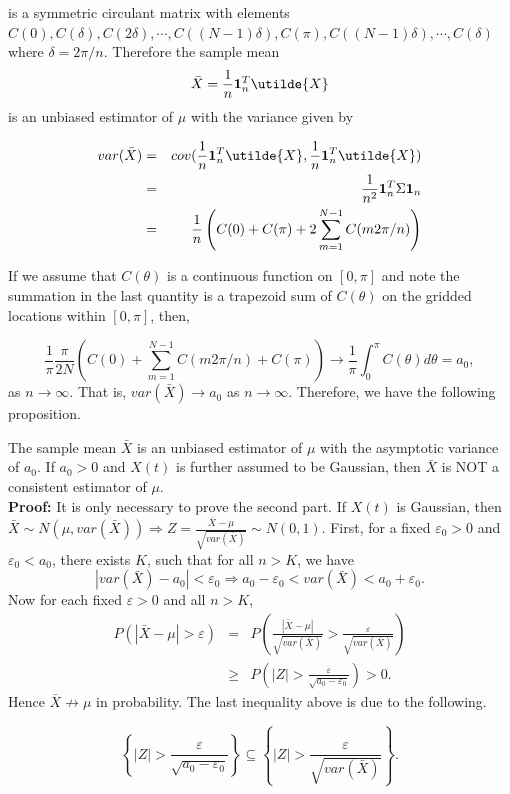 is a symmetric circulant matrix with elements $C(0),C(\delta), C(2\delta), \cdots, C((N-1)\delta), C(\pi),  C((N-1)\delta), \cdots, C(\delta)$ where $\delta = 2\pi/n$. Therefore the sample mean
\[
\bar{X} = \frac{1}{n}{\bf 1}_n^T \utilde{X}
\]
is an unbiased estimator of $\mu$ with the variance given by

\begin{eqnarray*}
var(\bar{X}) &=& cov(\frac{1}{n}{\bf 1}_n^T \utilde{X}, \frac{1}{n}{\bf 1}_n^T \utilde{X}) \nonumber \\
	&=& \frac{1}{n^2}{\bf 1}_n^T \Sigma {\bf 1}_n \nonumber \\
	&=& \frac{1}{n} \left(C(0)+C(\pi)+2 \sum_{m=1}^{N-1}C(m 2\pi/n)\right) \nonumber
\end{eqnarray*}

If we assume that $C(\theta)$ is a continuous function on $[0, \pi]$ and note the summation in the last quantity is a trapezoid sum of $C(\theta)$ on the gridded locations within $[0, \pi]$, then,

\[
\frac{1}{\pi} \frac{\pi}{2 N} \left(C(0) + \sum_{m=1}^{N-1}C(m 2\pi/n) + C(\pi) \right) \to \frac{1}{\pi} \int_0^\pi C(\theta)d\theta = a_0,
\]
as $n \to \infty$. That is, $var(\bar{X}) \to a_0$ as $n \to \infty$. Therefore, we have the following proposition. \\

\begin{prop} \label{prop3.1}

The sample mean $\bar{X}$ is an unbiased estimator of $\mu$ with the asymptotic variance of $a_0$. If $a_0 > 0$ and $X(t)$ is further assumed to be Gaussian, then $\bar{X}$ is NOT a consistent estimator of $\mu$. \\

{\bf Proof:} It is only necessary to prove the second part. If $X(t)$ is Gaussian, then $\bar{X} \sim N(\mu, var(\bar{X})) \Rightarrow Z = \frac{\bar{X} - \mu}{\sqrt{var(\bar{X})}} \sim N(0, 1)$. First, for a fixed $\varepsilon_0 > 0$ and $\varepsilon_0 < a_0$, there exists $K$, such that for all $n > K$, we have
\[
|var(\bar{X}) - a_0| < \varepsilon_0 \Rightarrow a_0 - \varepsilon_0 < var(\bar{X}) < a_0 + \varepsilon_0.
\]
Now for each fixed $\varepsilon > 0$ and all $n > K$,
\begin{eqnarray*}
P\left(|\bar{X} - \mu| > \varepsilon\right) &=& P\left(\frac{|\bar{X} - \mu|}{\sqrt{var(\bar{X})}} > \frac{\varepsilon}{\sqrt{var(\bar{X})}} \right) \\
&\ge& P\left(|Z| > \frac{\varepsilon}{\sqrt{a_0 - \varepsilon_0}} \right) > 0.
\end{eqnarray*}
Hence $\bar{X} \not\to \mu$ in probability. The last inequality above is due to the following.

\[
\left\{|Z| > \frac{\varepsilon}{\sqrt{a_0 - \varepsilon_0}} \right\} \subseteq \left\{|Z| > \frac{\varepsilon}{\sqrt{var(\bar{X})}}\right\}.
\]

\end{prop}

